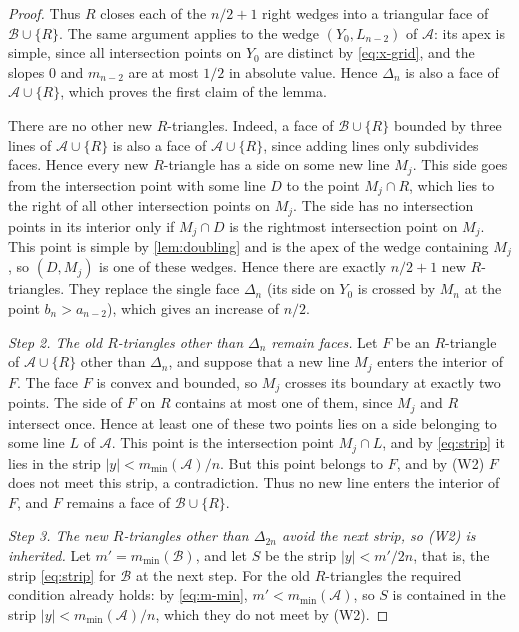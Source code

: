 \begin{proof}
Thus $R$ closes each of the $n/2+1$ right wedges into a triangular face of $\mathcal B\cup\{R\}$.
The same argument applies to the wedge $(Y_0,L_{n-2})$ of $\mathcal A$: its apex is simple, since all intersection points on $Y_0$ are distinct by \eqref{eq:x-grid}, and the slopes $0$ and $m_{n-2}$ are at most $1/2$ in absolute value.
Hence $\Delta_n$ is also a face of $\mathcal A\cup\{R\}$, which proves the first claim of the lemma.

There are no other new $R$-triangles. Indeed, a face of $\mathcal B\cup\{R\}$ bounded by three lines of $\mathcal A\cup\{R\}$ is also a face of $\mathcal A\cup\{R\}$, since adding lines only subdivides faces. Hence every new $R$-triangle has a side on some new line $M_j$.
This side goes from the intersection point with some line $D$ to the point $M_j\cap R$, which lies to the right of all other intersection points on $M_j$. The side has no intersection points in its interior only if $M_j\cap D$ is the rightmost intersection point on $M_j$.
This point is simple by \cref{lem:doubling} and is the apex of the wedge containing $M_j$, so $(D,M_j)$ is one of these wedges.
Hence there are exactly $n/2+1$ new $R$-triangles. They replace the single face $\Delta_n$ (its side on $Y_0$ is crossed by $M_n$ at the point $b_n>a_{n-2}$), which gives an increase of $n/2$.

\emph{Step 2. The old $R$-triangles other than $\Delta_n$ remain faces.} Let $F$ be an $R$-triangle of $\mathcal A\cup\{R\}$ other than $\Delta_n$, and suppose that a new line $M_j$ enters the interior of $F$.
The face $F$ is convex and bounded, so $M_j$ crosses its boundary at exactly two points.
The side of $F$ on $R$ contains at most one of them, since $M_j$ and $R$ intersect once.
Hence at least one of these two points lies on a side belonging to some line $L$ of $\mathcal A$. This point is the intersection point $M_j\cap L$, and by \eqref{eq:strip} it lies in the strip $|y|<m_{\min}(\mathcal A)/n$.
But this point belongs to $F$, and by \textup{(W2)} $F$ does not meet this strip, a contradiction.
Thus no new line enters the interior of $F$, and $F$ remains a face of $\mathcal B\cup\{R\}$.

\emph{Step 3. The new $R$-triangles other than $\Delta_{2n}$ avoid the next strip, so \textup{(W2)} is inherited.} Let $m'=m_{\min}(\mathcal B)$, and let $S$ be the strip $|y|<m'/2n$, that is, the strip \eqref{eq:strip} for $\mathcal B$ at the next step.
For the old $R$-triangles the required condition already holds: by \eqref{eq:m-min}, $m'<m_{\min}(\mathcal A)$, so $S$ is contained in the strip $|y|<m_{\min}(\mathcal A)/n$, which they do not meet by \textup{(W2)}.


\end{proof}
